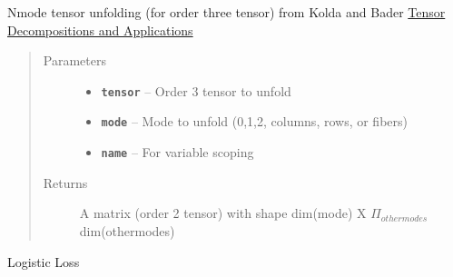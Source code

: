 \documentclass[letterpaper,10pt,english]{sphinxmanual}
\begin{document}
\begin{fulllineitems}
\label{node_ops:node_ops.nmode_tensor_tomatrix}
Nmode tensor unfolding (for order three tensor) from Kolda and Bader \href{http://dl.acm.org/citation.cfm?id=1655230}{Tensor Decompositions and Applications}
\begin{quote}\begin{description}
\item[{Parameters}] \leavevmode\begin{itemize}
\item {} 
\textbf{\texttt{tensor}} -- Order 3 tensor to unfold

\item {} 
\textbf{\texttt{mode}} -- Mode to unfold (0,1,2, columns, rows, or fibers)

\item {} 
\textbf{\texttt{name}} -- For variable scoping

\end{itemize}

\item[{Returns}] \leavevmode
A matrix (order 2 tensor) with shape dim(mode) X \(\Pi_{othermodes}\) dim(othermodes)

\end{description}\end{quote}

\end{fulllineitems}


\begin{fulllineitems}
\label{node_ops:node_ops.other_cross_entropy}
Logistic Loss

\end{fulllineitems}


\begin{fulllineitems}
\label{node_ops:node_ops.perplexity}
\end{fulllineitems}

\end{document}
